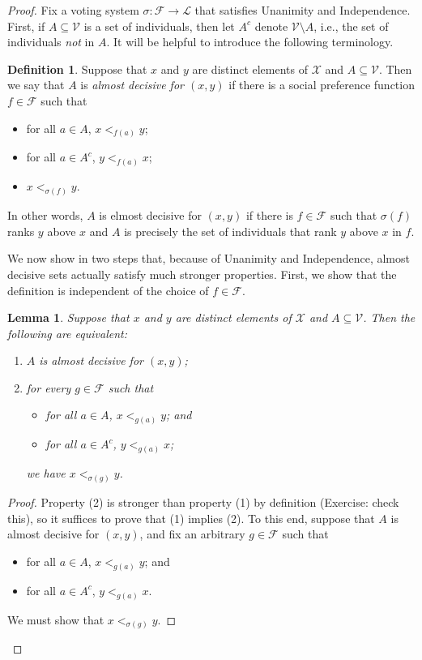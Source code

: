 \documentclass[a4paper]{memoir}
\newtheorem{lemma}[theorem]{Lemma}
\theoremstyle{definition}
\newtheorem{definition}[theorem]{Definition}
\newcommand{\mc}{\mathcal}
\newcommand{\ra}{\rightarrow}
\begin{document}
\begin{proof}
  Fix a voting system $\sigma : \mc{F} \ra \mc{L}$ that satisfies Unanimity and Independence. 
  First, if $A \subseteq \mc{V}$ is a set of individuals, then let $A^c$ denote 
  $\mc{V} \setminus A$, i.e., the set of individuals \emph{not} in $A$.
  It will be helpful to introduce the following terminology.
  
  \begin{definition}
    Suppose that $x$ and $y$ are distinct elements of $\mc{X}$ and $A \subseteq \mc{V}$. 
    Then we say that $A$ is \emph{almost decisive for $(x,y)$} if there is a social 
    preference function $f \in \mc{F}$ such that
    \begin{itemize}
      \item for all $a \in A$, $x <_{f(a)} y$;
      \item for all $a \in A^c$, $y <_{f(a)} x$;
      \item $x <_{\sigma(f)} y$.
    \end{itemize}
    In other words, $A$ is elmost decisive for $(x,y)$ if there is $f \in \mc{F}$ such that 
    $\sigma(f)$ ranks $y$ above $x$ and $A$ is precisely the set of individuals that 
    rank $y$ above $x$ in $f$.
  \end{definition}
  
  We now show in two steps that, because of Unanimity and Independence, almost decisive sets 
  actually satisfy much stronger properties. First, we show that the definition is independent 
  of the choice of $f \in \mc{F}$.
  
  \begin{lemma} \label{lemma: almost decisive}
    Suppose that $x$ and $y$ are distinct elements of $\mc{X}$ and $A \subseteq \mc{V}$. 
    Then the following are equivalent:
    \begin{enumerate}
      \item $A$ is almost decisive for $(x,y)$;
      \item for \emph{every} $g \in \mc{F}$ such that
      \begin{itemize}
        \item for all $a \in A$, $x <_{g(a)} y$; and
        \item for all $a \in A^c$, $y <_{g(a)} x$;
      \end{itemize}
      we have $x <_{\sigma(g)} y$.
    \end{enumerate}
  \end{lemma}
  
  \begin{proof}
    Property (2) is stronger than property (1) by definition (Exercise: check this), 
    so it suffices to prove that (1) implies (2). To this end, suppose that $A$ is 
    almost decisive for $(x,y)$, and fix an arbitrary $g \in \mc{F}$ such that
    \begin{itemize}
      \item for all $a \in A$, $x <_{g(a)} y$; and
      \item for all $a \in A^c$, $y <_{g(a)} x$.
    \end{itemize}
    We must show that $x <_{\sigma(g)} y$.   
    

\end{proof}
\end{proof}
\end{document}
